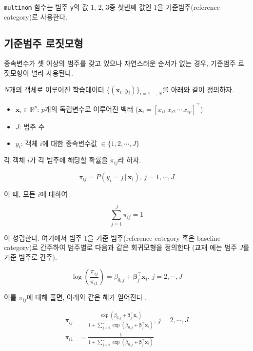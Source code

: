 \documentclass[]{book}
\providecommand{\tightlist}{%
  \setlength{\itemsep}{0pt}\setlength{\parskip}{0pt}}
\begin{document}
\texttt{multinom} 함수는 범주 \texttt{y}의 값 1, 2, 3중 첫번째 값인 1을 기준범주(reference category)로 사용한다.

\hypertarget{baseline-category-logit-model}{%
\subsection{기준범주 로짓모형}\label{baseline-category-logit-model}}

종속변수가 셋 이상의 범주를 갖고 있으나 자연스러운 순서가 없는 경우, 기준범주 로짓모형이 널리 사용된다.

\(N\)개의 객체로 이루어진 학습데이터 \(\{(\mathbf{x}_i, y_i)\}_{i = 1, \cdots, N}\)를 아래와 같이 정의하자.

\begin{itemize}
\tightlist
\item
  \(\mathbf{x}_i \in \mathbb{R}^p\): \(p\)개의 독립변수로 이루어진 벡터 (\(\mathbf{x}_i = [x_{i1} \, x_{i2} \, \cdots \, x_{ip}]^\top\))
\item
  \(J\): 범주 수
\item
  \(y_i\): 객체 \(i\)에 대한 종속변수값 \(\in \{1, 2, \cdots, J\}\)
\end{itemize}

각 객체 \(i\)가 각 범주에 해당할 확률을 \(\pi_{ij}\)라 하자.

\begin{equation*}
\pi_{ij} = P(y_i = j \, | \, \mathbf{x}_i), \, j = 1, \cdots, J
\end{equation*}

이 때, 모든 \(i\)에 대하여

\begin{equation*}
\sum_{j = 1}^{J} \pi_{ij} = 1
\end{equation*}

이 성립한다. 여기에서 범주 1을 기준 범주(reference category 혹은 baseline category)로 간주하여 범주별로 다음과 같은 회귀모형을 정의한다 (교재 \citep{jun2012datamining}에는 범주 \(J\)를 기준 범주로 간주).

\begin{equation*}
\log \left( \frac{\pi_{ij}}{\pi_{i1}} \right) = \beta_{0,j} + \boldsymbol\beta_{j}^\top \mathbf{x}_i, \, j = 2, \cdots, J
\end{equation*}

이를 \(\pi_{ij}\)에 대해 풀면, 아래와 같은 해가 얻어진다 \citep{czepiel2002maximum}.

\begin{equation}
\begin{split}
\pi_{ij} &= \frac{\exp \left( \beta_{0,j} + \boldsymbol\beta_{j}^\top \mathbf{x}_i \right)}{1 + \sum_{j = 2}^{J} \exp \left( \beta_{0,j} + \boldsymbol\beta_{j}^\top \mathbf{x}_i \right)}, \, j = 2, \cdots, J\\
\pi_{i1} &= \frac{1}{1 + \sum_{j = 2}^{J} \exp \left( \beta_{0,j} + \boldsymbol\beta_{j}^\top \mathbf{x}_i \right)}
\end{split}
\label{eq:multi-nominal-prob-sol}
\end{equation}
\end{document}
